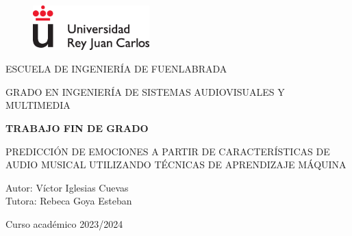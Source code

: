 \documentclass[12pt,a4paper,Spanish]{article}
\begin{document}

\begin{titlepage}
	
\begin{center}
	\begin{figure}
		\centering
		\includegraphics[width=0.4\textwidth]{./figs/logoURJC}
	\end{figure}
\end{center}


\begin{center}
	\large
	ESCUELA DE INGENIERÍA DE FUENLABRADA
	\vspace*{0.15in}
\end{center}

\begin{center}
	\large
	GRADO EN INGENIERÍA DE SISTEMAS AUDIOVISUALES Y MULTIMEDIA \\
	\vspace*{0.6in}
\end{center}

\begin{center}
	{\large \bf TRABAJO FIN DE GRADO}\\
\end{center}

\begin{center}
	\vspace*{0.2in}
	{\large
	{PREDICCIÓN DE EMOCIONES A PARTIR DE CARACTERÍSTICAS DE AUDIO MUSICAL UTILIZANDO TÉCNICAS DE APRENDIZAJE MÁQUINA} \\
	}
	\vspace*{0.3in}
	\vspace*{0.3in}
	\vspace*{0.1in}
\end{center}


\begin{center}
	{\large
	Autor: Víctor Iglesias Cuevas  \\[0.2cm]
	Tutora: Rebeca Goya Esteban \\[0.15cm]
	}
	\vspace*{0.1in}
	\vspace*{0.1in}
\end{center}


\begin{center}
	Curso académico 2023/2024\end{center}
\end{titlepage}
\end{document}
